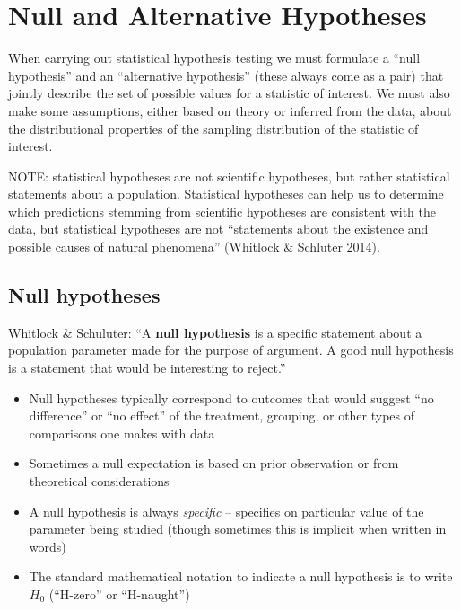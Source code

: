 \documentclass[]{book}
\providecommand{\tightlist}{%
  \setlength{\itemsep}{0pt}\setlength{\parskip}{0pt}}
\theoremstyle{definition}
\theoremstyle{definition}
\theoremstyle{definition}
\theoremstyle{remark}
\begin{document}
\hypertarget{null-and-alternative-hypotheses}{%
\section{Null and Alternative
Hypotheses}\label{null-and-alternative-hypotheses}}

When carrying out statistical hypothesis testing we must formulate a
``null hypothesis'' and an ``alternative hypothesis'' (these always come
as a pair) that jointly describe the set of possible values for a
statistic of interest. We must also make some assumptions, either based
on theory or inferred from the data, about the distributional properties
of the sampling distribution of the statistic of interest.

NOTE: statistical hypotheses are not scientific hypotheses, but rather
statistical statements about a population. Statistical hypotheses can
help us to determine which predictions stemming from scientific
hypotheses are consistent with the data, but statistical hypotheses are
not ``statements about the existence and possible causes of natural
phenomena'' (Whitlock \& Schluter 2014).

\hypertarget{null-hypotheses}{%
\subsection{Null hypotheses}\label{null-hypotheses}}

Whitlock \& Schuluter: ``A \textbf{null hypothesis} is a specific
statement about a population parameter made for the purpose of argument.
A good null hypothesis is a statement that would be interesting to
reject.''

\begin{itemize}
\tightlist
\item
  Null hypotheses typically correspond to outcomes that would suggest
  ``no difference'' or ``no effect'' of the treatment, grouping, or
  other types of comparisons one makes with data
\item
  Sometimes a null expectation is based on prior observation or from
  theoretical considerations
\item
  A null hypothesis is always \emph{specific} -- specifies on particular
  value of the parameter being studied (though sometimes this is
  implicit when written in words)
\item
  The standard mathematical notation to indicate a null hypothesis is to
  write \(H_0\) (``H-zero'' or ``H-naught'')
\end{itemize}
\end{document}
